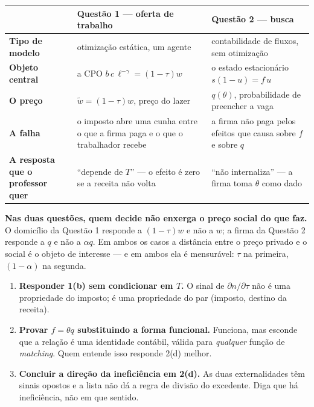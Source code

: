 \documentclass[11pt, a4paper]{article}
\newcommand{\wt}{\widetilde{w}}
\begin{document}
\begin{tcolorbox}[theorybox, title={As duas questões, lado a lado}]
\small
\renewcommand{\arraystretch}{1.35}
\begin{tabular}{@{}p{2.6cm}p{5.5cm}p{5.7cm}@{}}
\toprule
& \textbf{Questão 1 --- oferta de trabalho} & \textbf{Questão 2 --- busca} \\
\midrule
\textbf{Tipo de modelo} & otimização estática, um agente & contabilidade de fluxos, sem
  otimização \\
\textbf{Objeto central} & a CPO $b\,c\,\ell^{-\gamma} = (1-\tau)w$ & o estado estacionário
  $s(1-u) = f\,u$ \\
\textbf{O preço} & $\wt = (1-\tau)w$, preço do lazer & $q(\theta)$, probabilidade de
  preencher a vaga \\
\textbf{A falha} & o imposto abre uma cunha entre o que a firma paga e o que o
  trabalhador recebe & a firma não paga pelos efeitos que causa sobre $f$ e sobre $q$ \\
\textbf{A resposta que o professor quer} & ``depende de $T$'' --- o efeito é zero se a
  receita não volta & ``não internaliza'' --- a firma toma $\theta$ como dado \\
\bottomrule
\end{tabular}
\end{tcolorbox}

\begin{tcolorbox}[planbox, title={A frase que resume a lista}]
\small
\textbf{Nas duas questões, quem decide não enxerga o preço social do que faz.} O domicílio
da Questão 1 responde a $(1-\tau)w$ e não a $w$; a firma da Questão 2 responde a $q$ e não
a $\alpha q$. Em ambos os casos a distância entre o preço privado e o social é o objeto de
interesse --- e em ambos ela é mensurável: $\tau$ na primeira, $(1-\alpha)$ na segunda.
\end{tcolorbox}

\begin{tcolorbox}[trapbox, title={As três armadilhas mais caras da lista}]
\small
\begin{enumerate}[label=\arabic*.]
\item \textbf{Responder 1(b) sem condicionar em $T$.} O sinal de $\partial n/\partial\tau$
não é uma propriedade do imposto; é uma propriedade do par (imposto, destino da receita).
\item \textbf{Provar $f=\theta q$ substituindo a forma funcional.} Funciona, mas esconde
que a relação é uma identidade contábil, válida para \emph{qualquer} função de
\emph{matching}. Quem entende isso responde 2(d) melhor.
\item \textbf{Concluir a direção da ineficiência em 2(d).} As duas externalidades têm
sinais opostos e a lista não dá a regra de divisão do excedente. Diga que há ineficiência,
não em que sentido.
\end{enumerate}
\end{tcolorbox}
\end{document}
